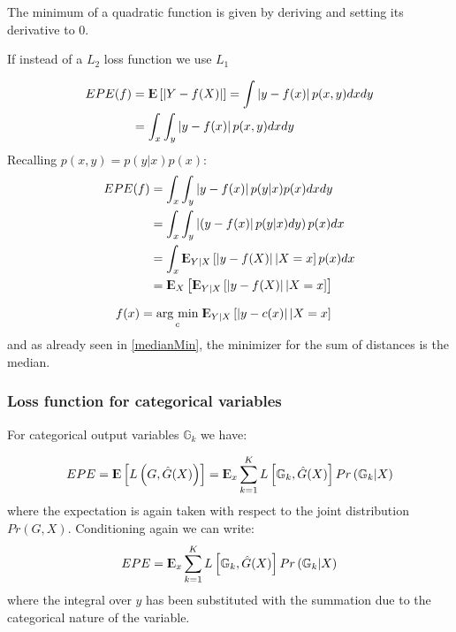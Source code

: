 \documentclass[12pt, letterpaper]{article}
\theoremstyle{definition}
\newcommand{\E}{{\rm I\kern-.3em E}}
\newcommand{\argmin}[1]{\underset{#1}{\operatorname{arg}\,\operatorname{min}}\;}
\begin{document}
The minimum of a quadratic function is given by deriving and setting its derivative to $0$.

If instead of a $L_2$ loss function we use $L_1$

\begin{equation}
\begin{aligned}
EPE(f) &= \E\left[ \left| Y- f(X) \right| \right] = \int \left| y- f(x) \right| p(x,y) dx dy \\
&= \int_x\int_y \left| y- f(x) \right|p(x,y) dx dy \\
\end{aligned}
\end{equation}
Recalling $p(x,y) = p( y|x) p(x)$:
\begin{equation}
\begin{aligned}
EPE(f) &= \int_x\int_y \left| y- f(x) \right|p(y|x)  p(x) dx dy \\
 &= \int_x \int_y \left| \left( y - f(x) \right| p(y|x) dy\right)  p(x) dx   \\
 &= \int_x \E_{Y|X} \left[ \left| y - f(X) \right| | X=x \right]  p(x) dx   \\
 &= \E_X \left[ \E_{Y|X} \left[ \left| y - f(X) \right| | X=x \right]    \right]   
\end{aligned}
\end{equation}

\begin{equation}
\begin{aligned}
f(x) &= \argmin{c} \E_{Y|X} \left[ \left| y - c(x) \right| | X=x \right]
\end{aligned}
\end{equation}
and as already seen in \ref{medianMin}, the minimizer for the sum of distances is the median.
\subsubsection{Loss function for categorical variables}
For categorical output variables $\mathbb{G}_k$ we have: 

\begin{equation}
\begin{aligned}
EPE = \E\left[ L\left( G, \hat{G}(X)\right)\right] = \E_x \sum_{k=1}^K L\left[ \mathbb{G}_k, \hat{G}(X)\right]Pr\left( \mathbb{G}_k|X\right)
\end{aligned}
\end{equation}
where the expectation is again taken with respect to the joint distribution $Pr(G,X)$. Conditioning again we can write:
\begin{equation}
\begin{aligned}
EPE = \E_x \sum_{k=1}^K L\left[ \mathbb{G}_k, \hat{G}(X)\right]Pr\left( \mathbb{G}_k|X\right)
\end{aligned}
\end{equation}
where the integral over $y$ has been substituted with the summation due to the categorical nature of the variable.
\end{document}

